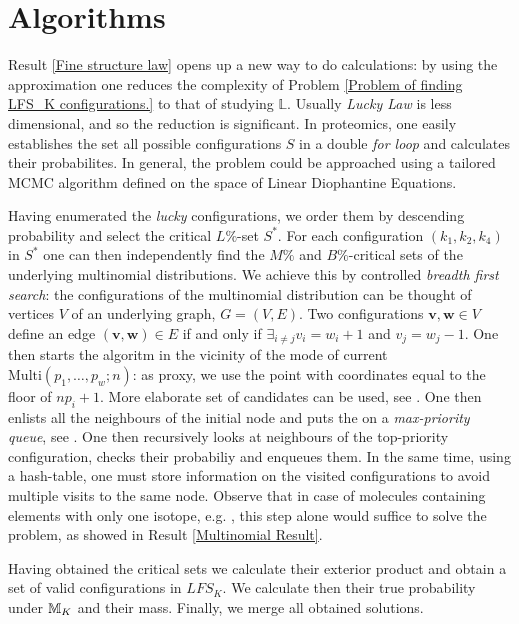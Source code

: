 \section{Algorithms}

Result \ref{Fine structure law} opens up a new way to do calculations: by using the approximation one reduces the complexity of Problem \ref{Problem of finding LFS_K configurations.} to that of studying $\mathbb{L}$. Usually {\it Lucky Law} is less dimensional, and so the reduction is significant. In proteomics, one easily establishes the set all possible configurations $S$ in a double {\it for loop} and calculates their probabilites. In general, the problem could be approached using a tailored MCMC algorithm defined on the space of Linear Diophantine Equations.   
	
Having enumerated the {\it lucky} configurations, we order them by descending probability and select the critical $L\%$-set $S^*$. For each configuration $(k_1, k_2, k_4)$ in $S^*$ one can then independently find the $M\%$ and $B\%$-critical sets of the underlying multinomial distributions. We achieve this by controlled {\it breadth first search}: the configurations of the multinomial distribution can be thought of vertices $V$ of an underlying graph, $G = (V,E)$. Two configurations $\bm{v}, \bm{w} \in V$ define an edge $(\bm{v}, \bm{w}) \in E$ if and only if $\exists_{i \not= j} v_i = w_i + 1$ and $v_j = w_j - 1$. One then starts the algoritm in the vicinity of the mode of current $\mathrm{Multi}\left( p_1, \dots, p_w; n \right)$: as proxy, we use the point with coordinates equal to the floor of $n p_i + 1$. More elaborate set of candidates can be used, see \cite{Gall2003DeterminationOfTheModesOfMultinomial}. One then enlists all the neighbours of the initial node and puts the on a {\it max-priority queue}, see \cite{Cormen2001IntroductionToAlgorithms}. One then recursively looks at neighbours of the top-priority configuration, checks their probabiliy and enqueues them. In the same time, using a hash-table, one must store information on the visited configurations to avoid multiple visits to the same node. Observe that in case of molecules containing elements with only one isotope, e.g. \smallMolecule, this step alone would suffice to solve the problem, as showed in Result \ref{Multinomial Result}.

Having obtained the critical sets we calculate their exterior product and obtain a set of valid configurations in $LFS_K$. We calculate then their true probability under $\mathbb{M}_K$ and their mass. Finally, we merge all obtained solutions.

